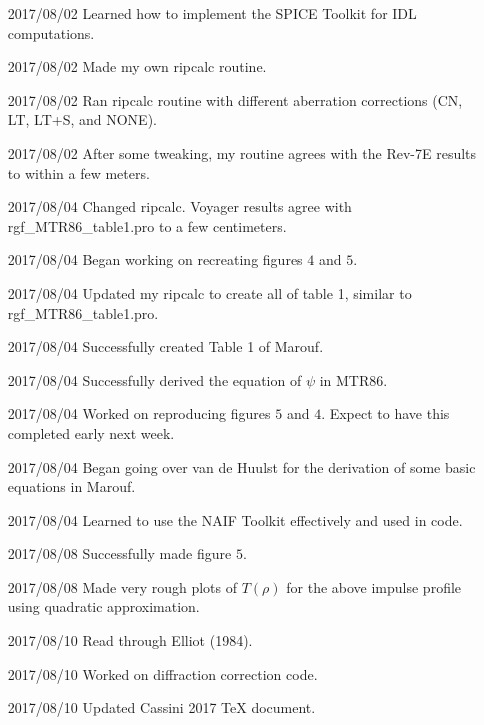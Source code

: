 \documentclass[crop=false,class=article,oneside]{standalone}
\begin{document}
\begin{enumerate}[leftmargin=55pt]
            \item[2017/08/02] Learned how to implement the SPICE Toolkit
                              for IDL computations.
            \item[2017/08/02] Made my own ripcalc routine.
            \item[2017/08/02] Ran ripcalc routine with different
                              aberration corrections (CN, LT, LT+S, and NONE).
            \item[2017/08/02] After some tweaking, my routine
                              agrees with the
                              Rev-7E results to within a few meters.
            \item[2017/08/04] Changed ripcalc. Voyager results
                              agree with rgf\_MTR86\_table1.pro to a
                              few centimeters.
            \item[2017/08/04] Began working on recreating
                              figures $4$ and $5$.
            \item[2017/08/04] Updated my ripcalc to create all of table 1,
                              similar to rgf\_MTR86\_table1.pro.
            \item[2017/08/04] Successfully created Table 1 of Marouf. 
            \item[2017/08/04] Successfully derived the equation of $\psi$
                              in MTR86.
            \item[2017/08/04] Worked on reproducing figures $5$ and $4$.
                              Expect to have this completed early next week.
            \item[2017/08/04] Began going over van de Huulst for
                              the derivation
                              of some basic equations in Marouf.
            \item[2017/08/04] Learned to use the NAIF Toolkit effectively
                              and used in code.
            \item[2017/08/08] Successfully made figure $5$. 
            \item[2017/08/08] Made very rough plots of $T(\rho)$ for the
                              above impulse profile using quadratic
                              approximation.
            \item[2017/08/10] Read through Elliot (1984).
            \item[2017/08/10] Worked on diffraction correction code.
            \item[2017/08/10] Updated Cassini 2017 TeX document.

\end{enumerate}
\end{document}
